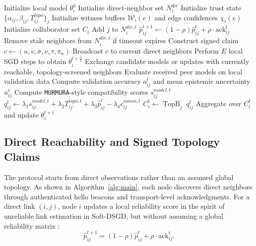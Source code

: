 \documentclass[journal]{IEEEtran}
\theoremstyle{definition}
\theoremstyle{remark}
\begin{document}
\begin{algorithm}[t]
\caption{DMTT: Dynamic \texttt{MURMURA} with Trusted Topology}
\label{alg:main}
\begin{algorithmic}[1]
\State Initialize local model $\theta_i^0$
\State Initialize direct-neighbor set $N_i^{dir}$
\State Initialize trust state $\{\alpha_{ij},\beta_{ij},T_{ij}^{topo}\}_j$
\State Initialize witness buffers $\mathcal{W}_i(e)$ and edge confidences $\chi_i(e)$
\State Initialize collaborator set $C_i$
        \State Add $j$ to $N_i^{dir,t}$
        \State $\hat{p}_{ij}^{t+1} \gets (1-\rho)\hat{p}_{ij}^{t} + \rho \cdot \mathrm{ack}_{ij}^{t}$
    \EndFor
    \State Remove stale neighbors from $N_i^{dir,t}$ if timeout expires
        \State Construct signed claim $c \gets (u,v,\sigma,\nu,\tau,\pi_u)$
        \State Broadcast $c$ to current direct neighbors
    \EndIf
        \State {}
    \EndFor
        \State {}
    \EndFor
        \State {}
    \EndFor
    \State Perform $E$ local SGD steps to obtain $\theta_i^{t+\frac{1}{2}}$
    \State Exchange candidate models or updates with currently reachable, topology-screened neighbors
     \State Evaluate received peer models on local validation data
    \State Compute validation accuracy $a_{ij}^t$ and mean epistemic uncertainty $\bar{u}_{ij}^t$
    \State Compute \texttt{MURMURA}-style compatibility scores $s_{ij}^{model,t}$
        \State $q_{ij}^t \gets \lambda_1 s_{ij}^{model,t} + \lambda_2 T_{ij}^{topo,t} + \lambda_3 \hat{p}_{ij}^{t} - \lambda_4 c_{ij}^{comm,t}$
    \EndFor
    \State $C_i^t \gets \operatorname{TopB}_j \; q_{ij}^t$
    \State Aggregate over $C_i^t$ and update $\theta_i^{t+1}$
\EndFor
\end{algorithmic}
\end{algorithm}

\subsection{Direct Reachability and Signed Topology Claims}

The protocol starts from direct observations rather than an assumed global topology. As shown in Algorithm~\ref{alg:main}, each node discovers direct neighbors through authenticated hello beacons and transport-level acknowledgments. For a direct link $(i,j)$, node $i$ updates a local reliability score in the spirit of unreliable link estimation in Soft-DSGD, but without assuming a global reliability matrix \cite{ye2022decentralized}:
\begin{equation}
\hat{p}_{ij}^{t+1} = (1-\rho)\hat{p}_{ij}^{t} + \rho \cdot \text{ack}_{ij}^{t}.
\end{equation}
\end{document}
